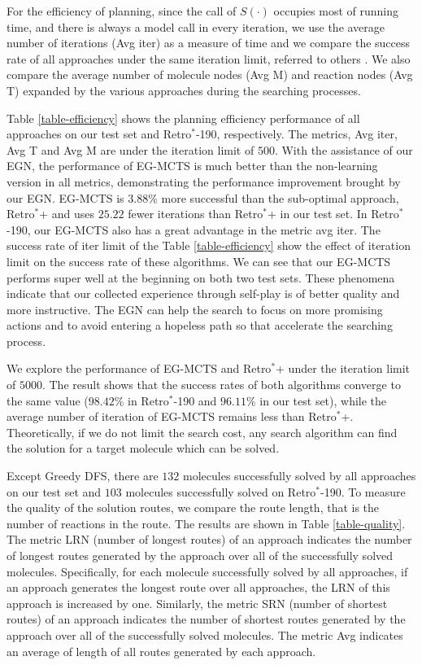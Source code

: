 \documentclass[sn-mathphys,Numbered]{sn-jnl}
\begin{document}
For the efficiency of planning, since the call of $S(\cdot)$ occupies most of running time, and there is always a model call in every iteration, we use the average number of iterations (Avg iter) as a measure of time and we compare the success rate of all approaches under the same iteration limit, referred to others \cite{retro2020,2022,DFPN-E2019}. We also compare the average number of molecule nodes (Avg M) and reaction nodes (Avg T) expanded by the various approaches during the searching processes.  

Table \ref{table-efficiency} shows the planning efficiency performance of all approaches on our test set and Retro$^*$-190, respectively. The metrics, Avg iter, Avg T and Avg M are under the iteration limit of $500$. 
With the assistance of our EGN, the performance of EG-MCTS is much better than the non-learning version in all metrics, demonstrating the performance improvement brought by our EGN.
EG-MCTS is $3.88\%$ more successful than the sub-optimal approach, Retro$^*$+ and uses $25.22$ fewer iterations than Retro$^*$+ in our test set. In Retro$^*$-190, our EG-MCTS also has a great advantage in the metric avg iter. 
The success rate of iter limit of the Table \ref{table-efficiency} show the effect of iteration limit on the success rate of these algorithms. We can see that our EG-MCTS performs super well at the beginning on both two test sets. These phenomena indicate that our collected experience through self-play is of better quality and more instructive. The EGN can help the search to focus on more promising actions and to avoid entering a hopeless path so that accelerate the searching process. 

We explore the performance of EG-MCTS and Retro$^*$+ under the iteration limit of $5000$. The result shows that the success rates of both algorithms converge to the same value ($98.42\%$ in Retro$^*$-190 and $96.11\%$ in our test set), while the average number of iteration of EG-MCTS remains less than Retro$^*$+. Theoretically, if we do not limit the search cost, any search algorithm can find the solution for a target molecule which can be solved. 


Except Greedy DFS, there are $132$ molecules successfully solved by all approaches on our test set and $103$ molecules successfully solved on Retro$^*$-190.
To measure the quality of the solution routes, we compare the route length, that is the number of reactions in the route. The results are shown in Table \ref{table-quality}. 
The metric LRN (number of longest routes) of an approach indicates the number of longest routes generated by the approach over all of the successfully solved molecules. 
 Specifically, for each molecule successfully solved by all approaches, if an approach generates the longest route over all approaches, the LRN of this approach is increased by one. Similarly,
the metric SRN (number of shortest routes) of an approach indicates the number of shortest routes generated by the approach over all of the successfully solved molecules. 
 The metric Avg indicates an average of length of all routes generated by each approach.
\end{document}
